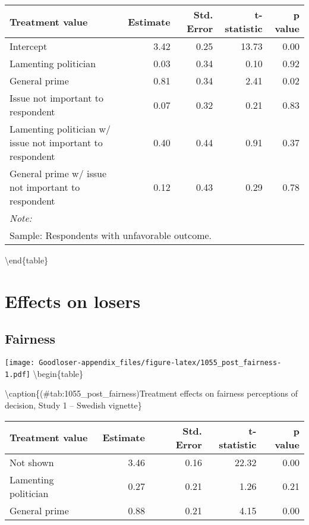 \documentclass[
]{book}
\begin{document}
\begin{tabular}[t]{lrrrr}
\toprule
Treatment value & Estimate & Std. Error & t-statistic & p value\\
\midrule
Intercept & 3.42 & 0.25 & 13.73 & 0.00\\
Lamenting politician & 0.03 & 0.34 & 0.10 & 0.92\\
General prime & 0.81 & 0.34 & 2.41 & 0.02\\
Issue not important to respondent & 0.07 & 0.32 & 0.21 & 0.83\\
Lamenting politician w/ issue not important to respondent & 0.40 & 0.44 & 0.91 & 0.37\\
\addlinespace
General prime w/ issue not important to respondent & 0.12 & 0.43 & 0.29 & 0.78\\
\bottomrule
\multicolumn{5}{l}{\textit{Note: }}\\
\multicolumn{5}{l}{Sample: Respondents with unfavorable outcome.}\\
\end{tabular}

\textbackslash end\{table\}

\hypertarget{effects-on-losers}{%
\chapter{Effects on losers}\label{effects-on-losers}}

\hypertarget{fairness-1}{%
\section{Fairness}\label{fairness-1}}

\texttt{[image: Goodloser-appendix\_files/figure-latex/1055\_post\_fairness-1.pdf]} \textbackslash begin\{table\}

\textbackslash caption\{(\#tab:1055\_post\_fairness)Treatment effects on fairness perceptions of decision, Study 1 -- Swedish vignette\}
\centering

\begin{tabular}[t]{lrrrr}
\toprule
Treatment value & Estimate & Std. Error & t-statistic & p value\\
\midrule
Not shown & 3.46 & 0.16 & 22.32 & 0.00\\
Lamenting politician & 0.27 & 0.21 & 1.26 & 0.21\\
General prime & 0.88 & 0.21 & 4.15 & 0.00\\
\bottomrule
\end{tabular}
\end{document}
